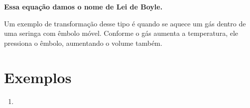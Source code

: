 \documentclass[12pt]{extarticle}
\newcommand{\<}{\langle}
\renewcommand{\>}{\rangle}
\theoremstyle{definition}
\begin{document}
\textbf{Essa equação damos o nome de Lei de Boyle.}

Um exemplo de transformação desse tipo é quando se aquece um gás dentro de uma seringa com êmbolo móvel. Conforme o gás aumenta a temperatura, ele pressiona o êmbolo, aumentando o volume também.

\section{Exemplos}

\begin{enumerate}
    \item 
\end{enumerate}
\end{document}
